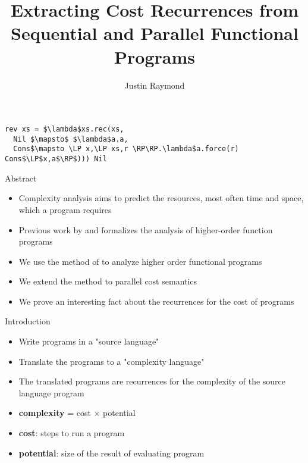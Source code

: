 \documentclass[pdf]{beamer}
\title{Extracting Cost Recurrences from Sequential and Parallel Functional Programs}
\author{Justin Raymond}
\institute{Professor Norman Danner}
\newcommand{\LP}{\langle}
\newcommand{\RP}{\rangle}
\begin{document}
\begin{lrbox}{\codebox}
\begin{lstlisting}
rev xs = $\lambda$xs.rec(xs,
  Nil $\mapsto$ $\lambda$a.a,
  Cons$\mapsto \LP x,\LP xs,r \RP\RP.\lambda$a.force(r) Cons$\LP$x,a$\RP$))) Nil
\end{lstlisting}
\end{lrbox}


\begin{frame}
  \titlepage
\end{frame}

\begin{frame}{Abstract}
  \begin{itemize}
    \item Complexity analysis aims to predict the resources, most often time and space, which a program requires
    \vfill
    \item Previous work by \citet{Danner2013} and \citet{Danner2015} formalizes the analysis of higher-order function programs
    \vfill
    \item We use the method of \citet{Danner2015} to analyze higher order functional programs
    \vfill
    \item We extend the method to parallel cost semantics
    \vfill
    \item We prove an interesting fact about the recurrences for the cost of programs
  \end{itemize}
\end{frame}

\begin{frame}{Introduction}
  \begin{itemize}
    \item Write programs in a "source language"
    \vfill
    \item Translate the programs to a "complexity language"
    \vfill
    \item The translated programs are recurrences for the complexity of the source language program
    \vfill
    \item \textbf{complexity} = cost $\times$ potential
    \vfill
    \item \textbf{cost}: steps to run a program
    \vfill
    \item \textbf{potential}: size of the result of evaluating program
  \end{itemize}
\end{frame}
\end{document}
